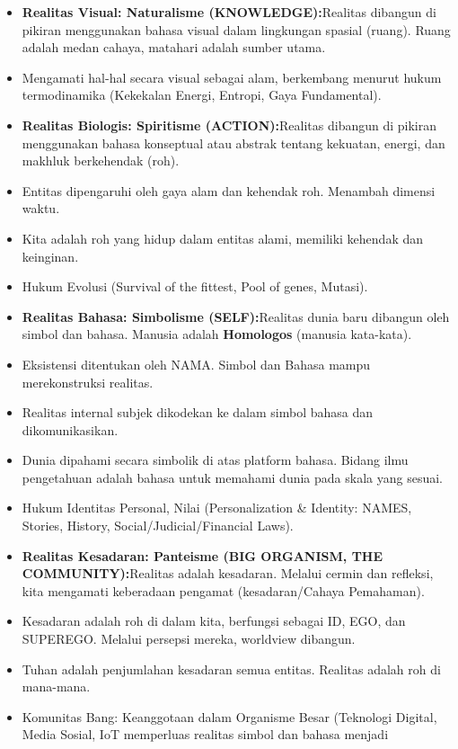 \documentclass[
  letterpaper,
  DIV=11,
  numbers=noendperiod]{scrreprt}
\providecommand{\tightlist}{%
  \setlength{\itemsep}{0pt}\setlength{\parskip}{0pt}}
\begin{document}
\begin{itemize}
\tightlist
\item
  \textbf{Realitas Visual: Naturalisme (KNOWLEDGE):}Realitas dibangun di
  pikiran menggunakan bahasa visual dalam lingkungan spasial (ruang).
  Ruang adalah medan cahaya, matahari adalah sumber utama.
\item
  Mengamati hal-hal secara visual sebagai alam, berkembang menurut hukum
  termodinamika (Kekekalan Energi, Entropi, Gaya Fundamental).
\item
  \textbf{Realitas Biologis: Spiritisme (ACTION):}Realitas dibangun di
  pikiran menggunakan bahasa konseptual atau abstrak tentang kekuatan,
  energi, dan makhluk berkehendak (roh).
\item
  Entitas dipengaruhi oleh gaya alam dan kehendak roh. Menambah dimensi
  waktu.
\item
  Kita adalah roh yang hidup dalam entitas alami, memiliki kehendak dan
  keinginan.
\item
  Hukum Evolusi (Survival of the fittest, Pool of genes, Mutasi).
\item
  \textbf{Realitas Bahasa: Simbolisme (SELF):}Realitas dunia baru
  dibangun oleh simbol dan bahasa. Manusia adalah \textbf{Homologos}
  (manusia kata-kata).
\item
  Eksistensi ditentukan oleh NAMA. Simbol dan Bahasa mampu
  merekonstruksi realitas.
\item
  Realitas internal subjek dikodekan ke dalam simbol bahasa dan
  dikomunikasikan.
\item
  Dunia dipahami secara simbolik di atas platform bahasa. Bidang ilmu
  pengetahuan adalah bahasa untuk memahami dunia pada skala yang sesuai.
\item
  Hukum Identitas Personal, Nilai (Personalization \& Identity: NAMES,
  Stories, History, Social/Judicial/Financial Laws).
\item
  \textbf{Realitas Kesadaran: Panteisme (BIG ORGANISM, THE
  COMMUNITY):}Realitas adalah kesadaran. Melalui cermin dan refleksi,
  kita mengamati keberadaan pengamat (kesadaran/Cahaya Pemahaman).
\item
  Kesadaran adalah roh di dalam kita, berfungsi sebagai ID, EGO, dan
  SUPEREGO. Melalui persepsi mereka, worldview dibangun.
\item
  Tuhan adalah penjumlahan kesadaran semua entitas. Realitas adalah roh
  di mana-mana.
\item
  Komunitas Bang: Keanggotaan dalam Organisme Besar (Teknologi Digital,
  Media Sosial, IoT memperluas realitas simbol dan bahasa menjadi

\end{itemize}
\end{document}

